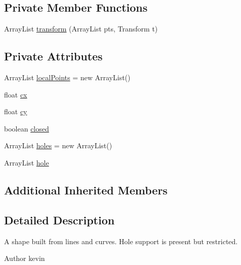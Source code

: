 \subsection*{Private Member Functions}
\begin{DoxyCompactItemize}
\item 
Array\+List \mbox{\hyperlink{classorg_1_1newdawn_1_1slick_1_1geom_1_1_path_ae23520204ac0d447d1ca0e88467c8efe}{transform}} (Array\+List pts, Transform t)
\end{DoxyCompactItemize}
\subsection*{Private Attributes}
\begin{DoxyCompactItemize}
\item 
Array\+List \mbox{\hyperlink{classorg_1_1newdawn_1_1slick_1_1geom_1_1_path_af67630a074a387ccbe4ea8ad67e013d8}{local\+Points}} = new Array\+List()
\item 
float \mbox{\hyperlink{classorg_1_1newdawn_1_1slick_1_1geom_1_1_path_acbc8efe2abb56bf2aa33889ec35a2e3b}{cx}}
\item 
float \mbox{\hyperlink{classorg_1_1newdawn_1_1slick_1_1geom_1_1_path_aecd6f6aaf8fd79b3acec8a24c2fd1a83}{cy}}
\item 
boolean \mbox{\hyperlink{classorg_1_1newdawn_1_1slick_1_1geom_1_1_path_ad5c0e47e461c78c960f30a7085c45c93}{closed}}
\item 
Array\+List \mbox{\hyperlink{classorg_1_1newdawn_1_1slick_1_1geom_1_1_path_aaed98e69613a609d6461530dc8c2f20b}{holes}} = new Array\+List()
\item 
Array\+List \mbox{\hyperlink{classorg_1_1newdawn_1_1slick_1_1geom_1_1_path_a55b64931dd61b899d51a58c1e969e728}{hole}}
\end{DoxyCompactItemize}
\subsection*{Additional Inherited Members}


\subsection{Detailed Description}
A shape built from lines and curves. Hole support is present but restricted.

\begin{DoxyAuthor}{Author}
kevin 
\end{DoxyAuthor}


